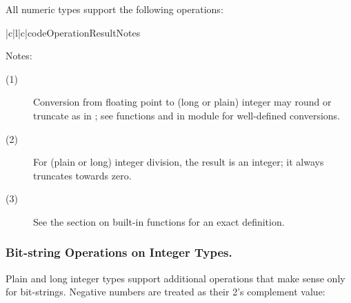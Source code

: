 All numeric types support the following operations:

\begin{tableiii}{|c|l|c|}{code}{Operation}{Result}{Notes}
\end{tableiii}

\noindent
Notes:
\begin{description}
\item[(1)]
Conversion from floating point to (long or plain) integer may round or
truncate as in \C{}; see functions  and  in module
 for well-defined conversions.

\item[(2)]
For (plain or long) integer division, the result is an integer; it
always truncates towards zero.

\item[(3)]
See the section on built-in functions for an exact definition.

\end{description}

\subsubsection{Bit-string Operations on Integer Types.}

Plain and long integer types support additional operations that make
sense only for bit-strings.  Negative numbers are treated as their 2's
complement value:

